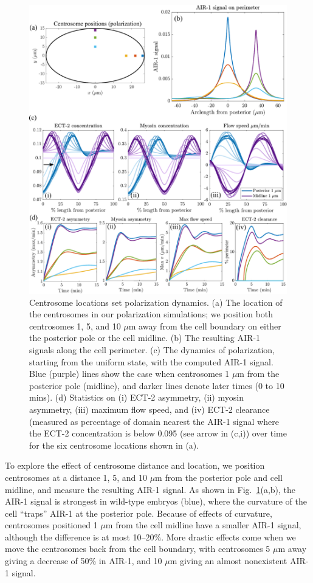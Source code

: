 \documentclass[11pt]{article}
\begin{document}
\begin{figure}
\centering
\includegraphics[width=\textwidth]{Glotzer/Fig5/Fig5-crop.pdf}
\caption{\label{fig:PolLoc}Centrosome locations set polarization dynamics. (a) The location of the centrosomes in our polarization simulations; we position both centrosomes 1, 5, and 10 $\mu$m away from the cell boundary on either the posterior pole or the cell midline. (b) The resulting AIR-1 signals along the cell perimeter. (c) The dynamics of polarization, starting from the uniform state, with the computed AIR-1 signal. Blue (purple) lines show the case when centrosomes 1 $\mu$m from the posterior pole (midline), and darker lines denote later times (0 to 10 mins). (d) Statistics on (i) ECT-2 asymmetry, (ii) myosin asymmetry, (iii) maximum flow speed, and (iv) ECT-2 clearance (measured as percentage of domain nearest the AIR-1 signal where the ECT-2 concentration is below 0.095 (see arrow in (c,i)) over time for the six centrosome locations shown in (a).}
\end{figure}

To explore the effect of centrosome distance and location, we position centrosomes at a distance 1, 5, and 10 $\mu$m from the posterior pole and cell midline, and measure the resulting AIR-1 signal. As shown in Fig.\ \ref{fig:PolLoc}(a,b), the AIR-1 signal is strongest in wild-type embryos (blue), where the curvature of the cell ``traps'' AIR-1 at the posterior pole. Because of effects of curvature, centrosomes positioned 1 $\mu$m from the cell midline have a smaller AIR-1 signal, although the difference is at most 10--20\%. More drastic effects come when we move the centrosomes back from the cell boundary, with centrosomes 5 $\mu$m away giving a decrease of 50\% in AIR-1, and 10 $\mu$m giving an almost nonexistent AIR-1 signal.
\end{document}
